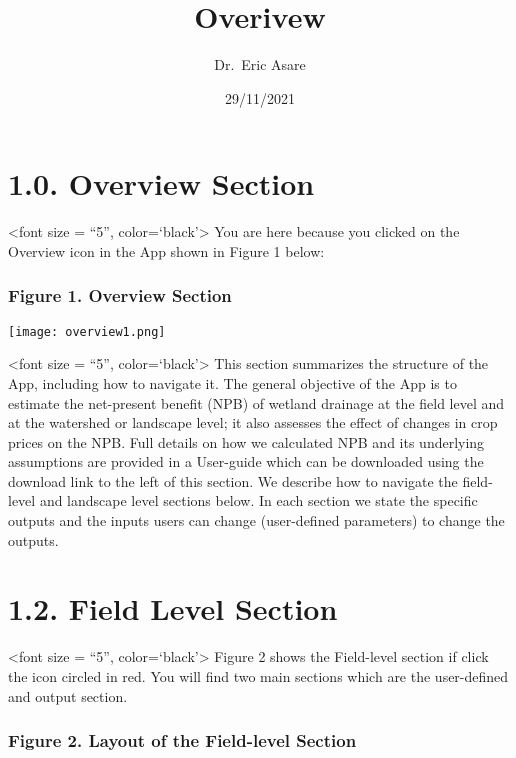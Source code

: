 \documentclass[
]{article}
\title{Overivew}
\author{Dr.~Eric Asare}
\date{29/11/2021}
\begin{document}
\maketitle

\hypertarget{overview-section}{%
\section{\texorpdfstring{ 1.0. Overview Section
}{ 1.0. Overview Section }}\label{overview-section}}

\textless font size = ``5'', color=`black'\textgreater{} You are here
because you clicked on the Overview icon in the App shown in Figure 1
below:

\hypertarget{figure-1.-overview-section}{%
\subsubsection{\texorpdfstring{ Figure 1. Overview Section
}{ Figure 1. Overview Section }}\label{figure-1.-overview-section}}

\texttt{[image: overview1.png]}

\textless font size = ``5'', color=`black'\textgreater{} This section
summarizes the structure of the App, including how to navigate it. The
general objective of the App is to estimate the net-present benefit
(NPB) of wetland drainage at the field level and at the watershed or
landscape level; it also assesses the effect of changes in crop prices
on the NPB. Full details on how we calculated NPB and its underlying
assumptions are provided in a User-guide which can be downloaded using
the download link to the left of this section. We describe how to
navigate the field-level and landscape level sections below. In each
section we state the specific outputs and the inputs users can change
(user-defined parameters) to change the outputs.

\hypertarget{field-level-section}{%
\section{\texorpdfstring{ 1.2. Field Level Section
}{ 1.2. Field Level Section }}\label{field-level-section}}

\textless font size = ``5'', color=`black'\textgreater{} Figure 2 shows
the Field-level section if click the icon circled in red. You will find
two main sections which are the user-defined and output section.

\hypertarget{figure-2.-layout-of-the-field-level-section}{%
\subsubsection{\texorpdfstring{ Figure 2. Layout of the Field-level
Section
}{ Figure 2. Layout of the Field-level Section }}\label{figure-2.-layout-of-the-field-level-section}}
\end{document}
